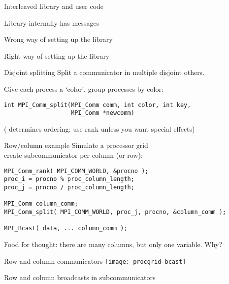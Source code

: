 \begin{numberedframe}{Interleaved library and user code}
\end{numberedframe}
\begin{numberedframe}{Library internally has messages}
\end{numberedframe}
\begin{numberedframe}{Wrong way of setting up the library}
\end{numberedframe}

\begin{numberedframe}{Right way of setting up the library}
\end{numberedframe}

\begin{numberedframe}{Disjoint splitting}
  Split a communicator in multiple disjoint others.
  
Give each process a `color', group processes by color:
\lstset{language=C}
\begin{lstlisting}
int MPI_Comm_split(MPI_Comm comm, int color, int key, 
                   MPI_Comm *newcomm)  
\end{lstlisting}
( determines ordering: use rank unless you want special effects)
\end{numberedframe}

\begin{numberedframe}{Row/column example}
  Simulate a processor grid\\
  create subcommunicator per column (or row):
\begin{lstlisting}
MPI_Comm_rank( MPI_COMM_WORLD, &procno );
proc_i = procno % proc_column_length;
proc_j = procno / proc_column_length;

MPI_Comm column_comm;
MPI_Comm_split( MPI_COMM_WORLD, proc_j, procno, &column_comm );

MPI_Bcast( data, ... column_comm );
\end{lstlisting}
Food for thought: there are many columns,
but only one  variable. Why?
\end{numberedframe}

\begin{numberedframe}{Row and column communicators}
  \texttt{[image: procgrid-bcast]}

  Row and column broadcasts in subcommunicators
\end{numberedframe}

